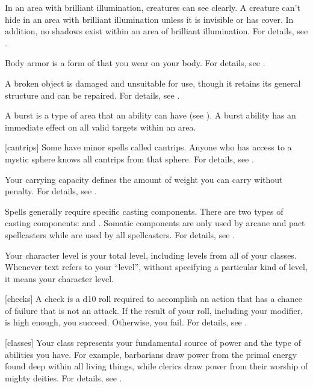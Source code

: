  In an area with brilliant illumination, creatures can see clearly.
A creature can't hide in an area with brilliant illumination unless it is invisible or has cover.
In addition, no shadows exist within an area of brilliant illumination.
For details, see .

 Body armor is a form of  that you wear on your body.
For details, see .

 A broken object is damaged and unsuitable for use, though it retains its general structure and can be repaired.
For details, see .

 A burst is a type of area that an ability can have (see ).
A burst ability has an immediate effect on all valid targets within an area.

[cantrips] Some  have minor spells called cantrips.
Anyone who has access to a mystic sphere knows all cantrips from that sphere.
For details, see .

 Your carrying capacity defines the amount of weight you can carry without penalty.
For details, see .

 Spells generally require specific casting components.
There are two types of casting components:  and .
Somatic components are only used by arcane and pact spellcasters while  are used by all spellcasters.
For details, see .

 Your character level is your total level, including levels from all of your classes.
Whenever text refers to your ``level'', without specifying a particular kind of level, it means your character level.

[checks] A check is a d10 roll required to accomplish an action that has a chance of failure that is not an attack.
If the result of your roll, including your modifier, is high enough, you succeed.
Otherwise, you fail.
For details, see .

[classes] Your class represents your fundamental source of power and the type of abilities you have.
For example, barbarians draw power from the primal energy found deep within all living things, while clerics draw power from their worship of mighty deities.
For details, see .


